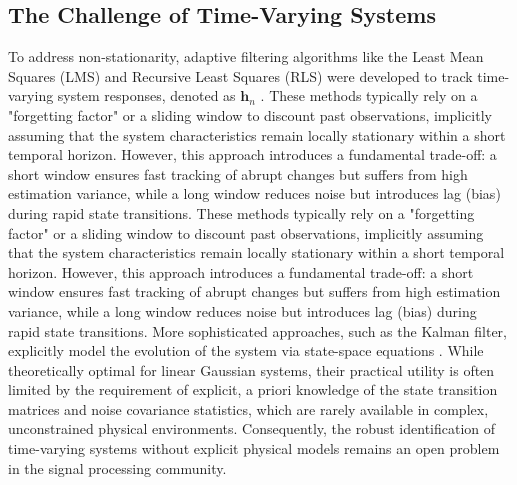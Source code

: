 \documentclass[conference]{IEEEtran}
\begin{document}
\subsection{The Challenge of Time-Varying Systems}
To address non-stationarity, adaptive filtering algorithms like the Least Mean Squares (LMS) and Recursive Least Squares (RLS) were developed to track time-varying system responses, denoted as $\mathbf{h}_n$ \cite{haykin2002adaptive, sayed2003fundamentals}. These methods typically rely on a "forgetting factor" or a sliding window to discount past observations, implicitly assuming that the system characteristics remain locally stationary within a short temporal horizon. However, this approach introduces a fundamental trade-off: a short window ensures fast tracking of abrupt changes but suffers from high estimation variance, while a long window reduces noise but introduces lag (bias) during rapid state transitions.
These methods typically rely on a "forgetting factor" or a sliding window to discount past observations, implicitly assuming that the system characteristics remain locally stationary within a short temporal horizon. However, this approach introduces a fundamental trade-off: a short window ensures fast tracking of abrupt changes but suffers from high estimation variance, while a long window reduces noise but introduces lag (bias) during rapid state transitions.
More sophisticated approaches, such as the Kalman filter, explicitly model the evolution of the system via state-space equations \cite{kalman1960new}. While theoretically optimal for linear Gaussian systems, their practical utility is often limited by the requirement of explicit, a priori knowledge of the state transition matrices and noise covariance statistics, which are rarely available in complex, unconstrained physical environments. Consequently, the robust identification of time-varying systems without explicit physical models remains an open problem in the signal processing community.
\end{document}
